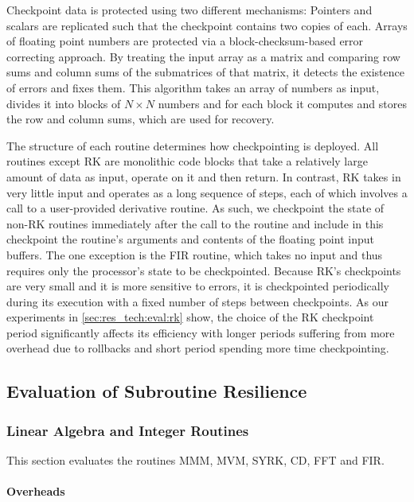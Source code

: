 \documentclass{sig-alternate}
\begin{document}
Checkpoint data is protected using two different mechanisms:
Pointers and scalars are replicated such that the checkpoint contains two copies of each.
Arrays of floating point numbers are protected via a block-checksum-based error correcting approach.
By treating the input array as a matrix and comparing row sums and column sums of the submatrices of that matrix, it detects the existence of errors and fixes them.
This algorithm takes an array of numbers as input, divides it into blocks of $N \times N$ numbers and for each block it computes and stores the row and column sums, which are used for recovery.

The structure of each routine determines how checkpointing is deployed.
All routines except RK are monolithic code blocks that take a relatively large amount of data as input, operate on it and then return.
In contrast, RK takes in very little input and operates as a long sequence of steps, each of which involves a call to a user-provided derivative routine.
As such, we checkpoint the state of non-RK routines immediately after the call to the routine and include in this checkpoint the routine's arguments and contents of the floating point input buffers.
The one exception is the FIR routine, which takes no input and thus requires only the processor's state to be checkpointed.
Because RK's checkpoints are very small and it is more sensitive to errors, it is checkpointed periodically during its execution with a fixed number of steps between checkpoints.
As our experiments in \ref{sec:res_tech:eval:rk} show, the choice of the RK checkpoint period significantly affects its efficiency with longer periods suffering from more overhead due to rollbacks and short period spending more time checkpointing.

\subsection{Evaluation of Subroutine Resilience}
\label{sec:res_tech:eval}

\subsubsection{Linear Algebra and Integer Routines}
\label{sec:res_tech:eval:la_int}

This section evaluates the routines MMM, MVM, SYRK, CD, FFT and FIR.

\paragraph{Overheads}
\end{document}
